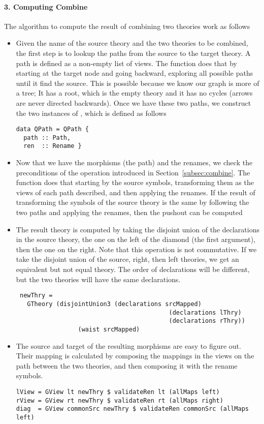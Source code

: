 \paragraph{3. Computing Combine}
The algorithm to compute the result of combining two theories work as follows 
\begin{itemize}
    \item Given the name of the source theory and the two theories to be combined, the first step is to lookup the paths from the source to the target theory. A path is defined as a non-empty list of views. The function  does that by starting at the target node and going backward, exploring all possible paths until it find the source. This is possible because we know our graph is more of a tree; It has a root, which is the empty theory and it has no cycles (arrows are never directed backwards). Once we have these two paths, we construct the two instances of , which is defined as follows 
\begin{verbatim}
data QPath = QPath { 
  path :: Path,
  ren  :: Rename }
\end{verbatim}

    \item Now that we have the morphisms (the path) and the renames, we check the preconditions of the operation introduced in Section~\ref{subsec:combine}. The function  does that starting by the source symbols, transforming them as the views of each path described, and then applying the renames. If the result of transforming the symbols of the source theory is the same by following the two paths and applying the renames, then the pushout can be computed 
    
    \item The result theory is computed by taking the disjoint union of the declarations in the source theory, the one on the left of the diamond (the first argument), then the one on the right. Note that this operation is not commutative. If we take the disjoint union of the source, right, then left theories, we get an equivalent but not equal theory. The order of declarations will be different, but the two theories will have the same declarations. 
\begin{verbatim}
 newThry = 
   GTheory (disjointUnion3 (declarations srcMapped)
                                          (declarations lThry) 
                                          (declarations rThry)) 
                 (waist srcMapped)
\end{verbatim}    
    \item The source and target of the resulting morphisms are easy to figure out. Their mapping is calculated by composing the mappings in the views on the path between the two theories, and then composing it with the rename symbols. 
\begin{verbatim}
lView = GView lt newThry $ validateRen lt (allMaps left)
rView = GView rt newThry $ validateRen rt (allMaps right)
diag  = GView commonSrc newThry $ validateRen commonSrc (allMaps left)
\end{verbatim}
\end{itemize}



